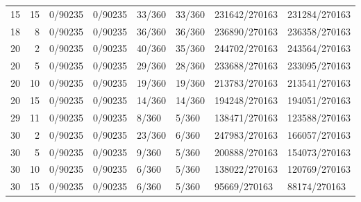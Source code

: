 \begin{tabular}{rrllllll}
15 & 15 &         0/90235 &             0/90235 &      33/360 &          33/360 & 231642/270163 &   231284/270163 \\
18 &  8 &         0/90235 &             0/90235 &      36/360 &          36/360 & 236890/270163 &   236358/270163 \\
20 &  2 &         0/90235 &             0/90235 &      40/360 &          35/360 & 244702/270163 &   243564/270163 \\
20 &  5 &         0/90235 &             0/90235 &      29/360 &          28/360 & 233688/270163 &   233095/270163 \\
20 & 10 &         0/90235 &             0/90235 &      19/360 &          19/360 & 213783/270163 &   213541/270163 \\
20 & 15 &         0/90235 &             0/90235 &      14/360 &          14/360 & 194248/270163 &   194051/270163 \\
29 & 11 &         0/90235 &             0/90235 &       8/360 &           5/360 & 138471/270163 &   123588/270163 \\
30 &  2 &         0/90235 &             0/90235 &      23/360 &           6/360 & 247983/270163 &   166057/270163 \\
30 &  5 &         0/90235 &             0/90235 &       9/360 &           5/360 & 200888/270163 &   154073/270163 \\
30 & 10 &         0/90235 &             0/90235 &       6/360 &           5/360 & 138022/270163 &   120769/270163 \\
30 & 15 &         0/90235 &             0/90235 &       6/360 &           5/360 &  95669/270163 &    88174/270163 \\
\bottomrule
\end{tabular}
